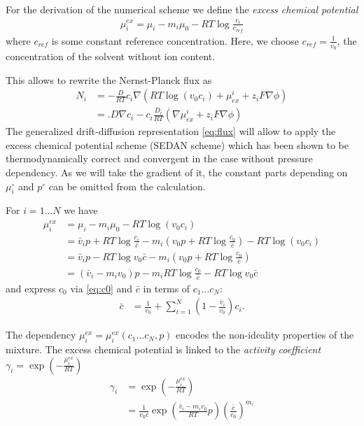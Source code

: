 \documentclass[12pt,oneside,reqno]{amsart}
\numberwithin{equation}{section}
\begin{document}
For the derivation of the numerical scheme we define the \textit{excess chemical potential}
\begin{align}\label{eq:muexdef}
  \mu^{ex}_i = \mu_i - m_i\mu_0 -  RT \log \frac{c_i}{c_{ref}}
\end{align}
where $c_{ref}$ is some constant reference concentration. Here, we choose $c_{ref}=\frac{1}{v_0}$, the
concentration of the solvent without ion content.

This   allows to rewrite the Nernst-Planck flux as 
\begin{align}
  N_i &=-\frac{D}{RT} c_i \nabla\left( RT \log (v_0c_i)  +  \mu^i_{ex} +z_iF\nabla\phi\right) \nonumber\\
      &= .D\nabla c_i  -  c_i\frac{D_i}{RT}(\nabla\mu^i_{ex} +z_iF\nabla\phi) \label{eq:flux}
\end{align}
The generalized drift-diffusion representation \eqref{eq:flux} will allow to apply the excess chemical potential
scheme (SEDAN scheme) \cite{GaudeulFuhrmann, EisenbergLiu} which has been shown to be thermodynamically correct and convergent in the case without pressure
dependency. As we will take the gradient of it, the constant parts depending on $\mu_i^\circ$ and $p^\circ$ can be
omitted from the calculation.

For $i=1\dots N$ we have
\begin{align}
  \mu_i^{ex} &= \mu_i -m_i \mu_0  - RT \log (v_0c_i)\nonumber\\
             &= \bar v_ip +  RT \log \frac{c_i}{\bar c}  -m_i\left(  v_0p + RT \log \frac{c_0}{\bar c}\right)  - RT \log (v_0c_i)  \nonumber\\
            &= \bar v_ip - RT\log v_0\bar c -m_i\left(v_0p + RT \log \frac{c_0}{\bar c}\right)\nonumber\\
            &= \left(\bar v_i-m_iv_0\right)p -m_iRT\log \frac{c_0}{\bar c} - RT\log v_0 \bar c \label{eq:muex}
\end{align}
and express $c_0$ via \eqref{eq:c0} and $\bar c$ in terms of $c_1\dots c_N$:
\begin{align*}
  \bar c &%
          = \frac{1}{v_0} + \sum_{i=1}^N \left(1- \frac{\bar v_i}{v_0}\right) c_i .
\end{align*}

\newpage
The dependency $\mu_i^{ex}=\mu_i^{ex}(c_1\dots c_N, p)$  encodes the non-ideality properties of the mixture.
The excess chemical potential is linked to the \textit{activity coefficient} $\gamma_i=\exp(-\frac{\mu_i^{ex}}{RT})$
\cite{IUPAC,Fuhrmann2015}
\begin{align}
  \gamma_i&=\exp(-\frac{\mu_i^{ex}}{RT})\\
         &= \frac{1}{v_0\bar c}\exp\left(\frac{\bar v_i-m_iv_0}{RT}p\right)\left(\frac{\bar c}{c_0}\right)^{m_i} \label{eq:gamma}
\end{align}
\end{document}
